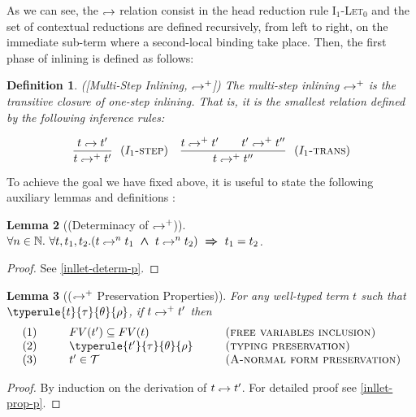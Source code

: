 \documentclass[a4paper,11pt,oneside]{article}
\theoremstyle{plain}
\newtheorem{definition}{Definition}[subsection]
\newtheorem{lemma}[definition]{Lemma}
\newcommand{\bwedge}{\boldsymbol{~\wedge~}}
\newcommand{\brarr}{\boldsymbol{~\Rightarrow~}}
\newcommand{\inlT}{\mathcal{T}}
\newcommand{\hookdownarrow}{\mathrel{\rotatebox[origin=c]{180}{$\hookleftarrow$}}}
\newcommand{\inlletarr}{\hookdownarrow}
\newcommand{\inlletplus}{\hookdownarrow^{+}}
\newcommand{\inllet}[2]{#1 \hookdownarrow #2}
\newcommand{\inllett}[2]{#1 \inlletplus #2}
\newcommand{\ilarr}{\hookdownarrow}
\begin{document}
As we can see, the $\ilarr$ relation consist in the head reduction rule \textsc{I$_1$-Let$_0$} and the set of contextual reductions are defined recursively, from left to right, on the immediate sub-term where a second-local binding take place. Then, the first phase of inlining is defined as follows: 

\begin{definition}([Multi-Step Inlining, $\inlletplus$]) The multi-step inlining $\inlletplus$ is the transitive closure of one-step inlining. That is, it is the smallest relation defined by the following inference rules:

$$\dfrac{\inllet{t}{t'}}{\inllett{t}{t'}}{~~(\textsc{$I_1$-step})}
\quad\dfrac{\inllett{t}{t'} 
\qquad \inllett{t'}{t''}}{\inllett{t}{t''}}{~~(\textsc{$I_1$-trans})}$$
\end{definition}

To achieve the goal we have fixed above, it is useful to state the following auxiliary lemmas and definitions :

\begin{lemma}[(Determinacy of $\inlletplus$)] 
	$\forall n \in \mathbb{N}.~ \forall t, t_1, t_2.
		(t \inlletarr^{n} {t_1} \bwedge t \inlletarr^{n} {t_2}) \brarr
			t_1 = t_2$.	\label{inllet-determ-l}	
\end{lemma}
\begin{proof} See \ref{inllet-determ-p}. \end{proof}

\begin{lemma}[($\inlletplus$ Preservation Properties)]
For any well-typed term $t$ such that\\ $\typerule{t}{\tau}{\theta}{\rho}$, if $\inllett{t}{t'}$ then
\begin{displaymath}
\begin{array}{l@{\hspace*{1cm}}l@{\hspace*{1cm}}l}
	(1)& FV(t') \subseteq FV(t) & \textsc{(free variables inclusion)} \\
	(2)& \typerule{t'}{\tau}{\theta}{\rho} &\textsc{(typing preservation)} \\
	(3)& t' \in \inlT & \textsc{(A-normal form preservation)}
\end{array}
\end{displaymath}
 \label{inllet-prop-l}
\end{lemma}
\begin{proof}
 By induction on the derivation of $\inllet{t}{t'}$. For detailed proof see
 \ref{inllet-prop-p}.
 \end{proof}
\end{document}
